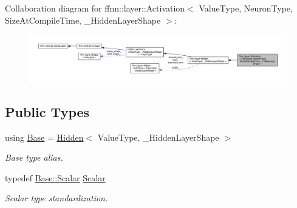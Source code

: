 Collaboration diagram for ffnn\-:\-:layer\-:\-:Activation$<$ Value\-Type, Neuron\-Type, Size\-At\-Compile\-Time, \-\_\-\-Hidden\-Layer\-Shape $>$\-:\nopagebreak
\begin{figure}[H]
\begin{center}
\leavevmode
\includegraphics[width=350pt]{classffnn_1_1layer_1_1_activation__coll__graph}
\end{center}
\end{figure}
\subsection*{Public Types}
\begin{DoxyCompactItemize}
\item 
using \hyperlink{classffnn_1_1layer_1_1_activation_a2f462178d98a5439e13962796c483459}{Base} = \hyperlink{classffnn_1_1layer_1_1_hidden}{Hidden}$<$ Value\-Type, \-\_\-\-Hidden\-Layer\-Shape $>$
\begin{DoxyCompactList}\small\item\em Base type alias. \end{DoxyCompactList}\item 
typedef \hyperlink{classffnn_1_1layer_1_1_layer_ab3b9b082aed9ee8d4e30a823b723a740}{Base\-::\-Scalar} \hyperlink{classffnn_1_1layer_1_1_activation_a5b1e9d46855882ea22be0b9703d67832}{Scalar}
\begin{DoxyCompactList}\small\item\em Scalar type standardization. \end{DoxyCompactList}\end{DoxyCompactItemize}
